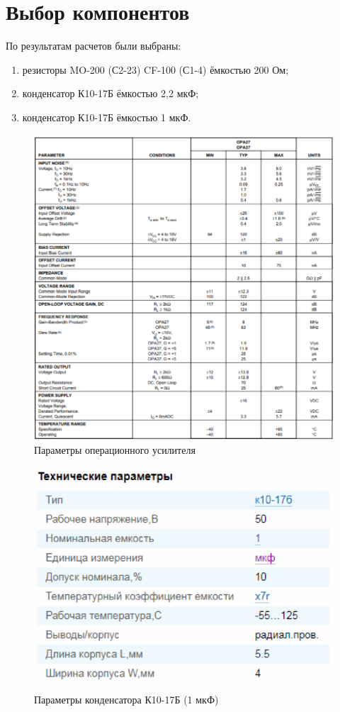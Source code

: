 \chapter{Выбор компонентов}

По результатам расчетов были выбраны:
\begin{enumerate}
\item резисторы MO-200 (С2-23) CF-100 (С1-4) ёмкостью 200 Ом;
\item конденсатор К10-17Б ёмкостью 2,2 мкФ;
\item конденсатор К10-17Б ёмкостью 1 мкФ. 
\end{enumerate}

\begin{figure}[h!]
	\centering
	\caption{Параметры операционного усилителя }
	\includegraphics{images/1.png}
\end{figure}

\begin{figure}[h!]
	\centering
	\caption{Параметры конденсатора К10-17Б (1 мкФ)}
	\includegraphics{images/2.png}
\end{figure}

